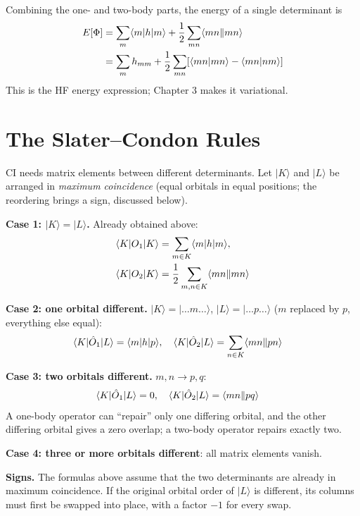 Combining the one- and two-body parts, the energy of a single determinant is
\begin{align}
E[\Phi] &= \sum_m \langle m|h|m\rangle + \frac{1}{2} \sum_{mn} \langle mn\Vert mn\rangle \notag \\
&= \sum_m h_{mm} + \frac{1}{2} \sum_{mn} [\langle mn\vert mn\rangle - \langle mn\vert nm\rangle] \label{eq:E-det}
\end{align}
This is the HF energy expression; Chapter 3 makes it variational.

\section{The Slater--Condon Rules}

CI needs matrix elements between different determinants. Let $|K\rangle$ and $|L\rangle$ be arranged in \emph{maximum coincidence} (equal orbitals in equal positions; the reordering brings a sign, discussed below).

\textbf{Case 1: $|K\rangle = |L\rangle$.} Already obtained above:
\begin{align*}
\langle K|O_1|K\rangle &= \sum_{m \in K} \langle m|h|m\rangle, \\
\langle K|O_2|K\rangle &= \frac{1}{2} \sum_{m,n \in K} \langle mn\Vert mn\rangle
\end{align*}

\textbf{Case 2: one orbital different.} $|K\rangle = |\dots m \dots\rangle$, $|L\rangle = |\dots p \dots\rangle$ ($m$ replaced by $p$, everything else equal):
\begin{align*}
\langle K|\hat{O}_1|L\rangle &= \langle m|h|p\rangle, \quad \langle K|\hat{O}_2|L\rangle = \sum_{n \in K} \langle mn\Vert pn\rangle
\end{align*}

\textbf{Case 3: two orbitals different.} $m, n \rightarrow p, q$:
\begin{align*}
\langle K|\hat{O}_1|L\rangle &= 0, \quad \langle K|\hat{O}_2|L\rangle = \langle mn\Vert pq\rangle
\end{align*}
A one-body operator can ``repair'' only one differing orbital, and the other differing orbital gives a zero overlap; a two-body operator repairs exactly two.

\textbf{Case 4: three or more orbitals different}: all matrix elements vanish.

\begin{pitfall}
\textbf{Signs.} The formulas above assume that the two determinants are already in maximum coincidence. If the original orbital order of $|L\rangle$ is different, its columns must first be swapped into place, with a factor $-1$ for every swap.
\end{pitfall}

